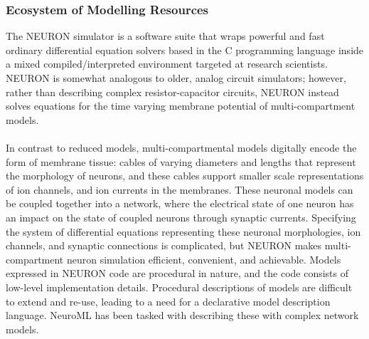 \subsubsection{Ecosystem of Modelling Resources}
The NEURON simulator is a software suite that wraps powerful and fast ordinary differential equation solvers based in the C programming language inside a mixed compiled/interpreted environment targeted at research scientists. NEURON is somewhat analogous to older, analog circuit simulators; however, rather than describing complex resistor-capacitor circuits, NEURON instead solves equations for the time varying membrane potential of multi-compartment models.\\
\\
In contrast to reduced models, multi-compartmental models digitally encode the form of membrane tissue: cables of varying diameters and lengths that represent the morphology of neurons, and these cables support smaller scale representations of ion channels, and ion currents in the membranes. These neuronal models can be coupled together into a network, where the electrical state of one neuron has an impact on the state of coupled neurons through synaptic currents. Specifying the system of differential equations representing these neuronal morphologies, ion channels, and synaptic connections is complicated, but NEURON makes multi-compartment neuron simulation efficient, convenient, and achievable. Models expressed in NEURON code are procedural in nature, and the code consists of low-level implementation details. Procedural descriptions of models are difficult to extend and re-use, leading to a need for a declarative model description language. NeuroML has been tasked with describing these with complex network models.\newline
\newline

